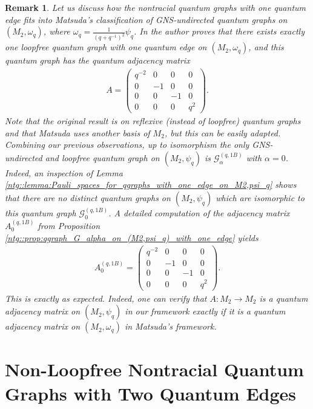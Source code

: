 \documentclass{amsart}
\newtheorem{remark}[thm]{Remark}
\begin{document}
\begin{remark}
    Let us discuss how the nontracial quantum graphs with one quantum edge fits into Matsuda's classification of GNS-undirected quantum graphs on $(M_2, \omega_q)$, where $\omega_q = \frac{1}{(q+q^{-1})^2} \psi_q$. In \cite[Theorem 3.5(2)]{matsuda_classification_2022} the author proves that there exists exactly one loopfree quantum graph with one quantum edge on $(M_2, \omega_q)$, and this quantum graph has the quantum adjacency matrix
    \begin{align*}
        A = \begin{pmatrix}
            q^{-2} & 0 & 0 & 0 \\
            0 & -1 & 0 & 0 \\
            0 & 0 & -1 & 0 \\
            0 & 0 & 0 & q^{2}
        \end{pmatrix}.
    \end{align*}
    Note that the original result is on reflexive (instead of loopfree) quantum graphs and that Matsuda uses another basis of $M_2$, but this can be easily adapted. Combining our previous observations, up to isomorphism the only GNS-undirected and loopfree quantum graph on $(M_2, \psi_q)$ is $\mathcal{G}_{\alpha}^{(q,1B)}$ with $\alpha = 0$. Indeed, an inspection of Lemma \ref{ntg::lemma:Pauli_spaces_for_qgraphs_with_one_edge_on_M2,psi_q} shows that there are no distinct quantum graphs on $(M_2, \psi_q)$ which are isomorphic to this quantum graph $\mathcal{G}_{0}^{(q,1B)}$. A detailed computation of the adjacency matrix $A_0^{(q,1B)}$ from Proposition \ref{ntg::prop:qgraph_G_alpha_on_(M2,psi_q)_with_one_edge} yields
    \begin{align*}
        A_0^{(q,1B)} = 
        \begin{pmatrix}
            q^{-2} & 0 & 0 & 0 \\
            0 & -1 & 0 & 0 \\
            0 & 0 & -1 & 0 \\
            0 & 0 & 0 & q^{2}
        \end{pmatrix}.
    \end{align*}
    This is exactly as expected. Indeed, one can verify that $A: M_2 \to M_2$ is a quantum adjacency matrix on $(M_2, \psi_q)$ in our framework exactly if it is a quantum adjacency matrix on $(M_2, \omega_q)$ in Matsuda's framework.
\end{remark}


\section{Non-Loopfree Nontracial Quantum Graphs with Two Quantum Edges}
\label{sec::n2e}
\end{document}
